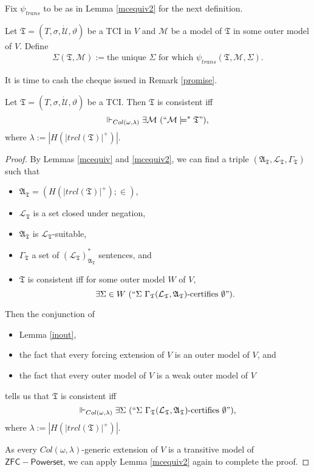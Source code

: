 \documentclass[12pt]{article}
\numberwithin{equation}{section}
\begin{document}
Fix $\psi_{trans}$ to be as in Lemma \ref{mcequiv2} for the next definition. 

\begin{defi}
Let $\mathfrak{T} = (T, \sigma, \dot{\mathcal{U}}, \vartheta)$ be a TCI in $V$ and $\mathcal{M}$ be a model of $\mathfrak{T}$ in some outer model of $V$. Define \begin{align*}
    \Sigma(\mathfrak{T}, \mathcal{M}) := \text{the unique } \Sigma \text{ for which } \psi_{trans}(\mathfrak{T}, \mathcal{M}, \Sigma).
\end{align*}
\end{defi}

It is time to cash the cheque issued in Remark \ref{promise}.

\begin{lem}\label{conalt}
Let $\mathfrak{T} = (T, \sigma, \dot{\mathcal{U}}, \vartheta)$ be a TCI. Then $\mathfrak{T}$ is consistent iff $$\Vdash_{Col(\omega, \lambda)} \exists \mathcal{M} \ (``\mathcal{M} \models^* \mathfrak{T}"),$$ where $\lambda := |H(|trcl(\mathfrak{T})|^+)|$.
\end{lem}

\begin{proof}
By Lemmas \ref{mcequiv} and \ref{mcequiv2}, we can find a triple $(\mathfrak{A}_{\mathfrak{T}}, \mathcal{L}_{\mathfrak{T}}, \Gamma_{\mathfrak{T}})$ such that 
\begin{itemize}
    \item $\mathfrak{A}_{\mathfrak{T}} = (H(|trcl(\mathfrak{T})|^+); \in)$,
    \item $\mathcal{L}_{\mathfrak{T}}$ is a set closed under negation, 
    \item $\mathfrak{A}_{\mathfrak{T}}$ is $\mathcal{L}_{\mathfrak{T}}$-suitable, 
    \item $\Gamma_{\mathfrak{T}}$ a set of $({\mathcal{L}_{\mathfrak{T}}})^*_{\mathfrak{A}_{\mathfrak{T}}}$ sentences, and
    \item $\mathfrak{T}$ is consistent iff for some outer model $W$ of $V$, $$\exists \Sigma \in W \ (``\Sigma \ \Gamma_{\mathfrak{T}} (\mathcal{L}_{\mathfrak{T}}, \mathfrak{A}_{\mathfrak{T}})\text{-certifies } \emptyset").$$
\end{itemize}
Then the conjunction of
\begin{itemize}
    \item Lemma \ref{inout},
    \item the fact that every forcing extension of $V$ is an outer model of $V$, and
    \item the fact that every outer model of $V$ is a weak outer model of $V$
\end{itemize}   
tells us that $\mathfrak{T}$ is consistent iff $$\Vdash_{Col(\omega, \lambda)} \exists \Sigma \ (``\Sigma \ \Gamma_{\mathfrak{T}} (\mathcal{L}_{\mathfrak{T}}, \mathfrak{A}_{\mathfrak{T}})\text{-certifies } \emptyset"),$$ where $\lambda := |H(|trcl(\mathfrak{T})|^+)|$. 

As every $Col(\omega, \lambda)$-generic extension of $V$ is a transitive model of $\mathsf{ZFC - Powerset}$, we can apply Lemma \ref{mcequiv2} again to complete the proof. 
\end{proof}
\end{document}
